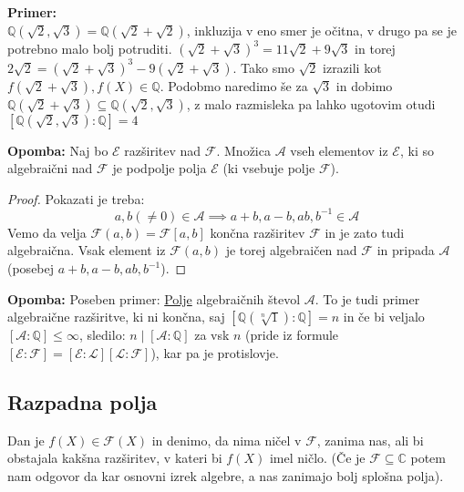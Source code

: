 \documentclass[a4paper]{article}
\newcounter{environment:definition_counter}
\newcounter{environment:theorem_counter}
\newcounter{environment:statement_counter}
\newcounter{example:example_counter}
\newenvironment{example}
{\textbf{Primer:}\\}
{\setcounter{example:example_counter}{0}}
\newenvironment{remark}
{\textbf{Opomba:}}
{}
\begin{document}
\begin{example}
$\mathbb{Q}(\sqrt{2}, \sqrt{3}) =  \mathbb{Q}(\sqrt{2} + \sqrt{2})$, inkluzija v eno smer je očitna, v drugo pa se je potrebno malo bolj potruditi. $(\sqrt{2} + \sqrt{3})^3 = 11\sqrt{2} + 9\sqrt{3}$ in torej $2\sqrt{2} = (\sqrt{2} + \sqrt{3})^3 - 9(\sqrt{2} + \sqrt{3})$. Tako smo $\sqrt{2}$ izrazili kot $f(\sqrt{2} + \sqrt{3}), f(X) \in \mathbb{Q}$. Podobmo naredimo še za $\sqrt{3}$ in dobimo $\mathbb{Q}(\sqrt{2} + \sqrt{3}) \subseteq \mathbb{Q}(\sqrt{2}, \sqrt{3})$, z malo razmisleka pa lahko ugotovim otudi $[\mathbb{Q}(\sqrt{2},\sqrt{3}):\mathbb{Q}] = 4$ 
\end{example}

\begin{remark}
Naj bo $\mathcal{E}$ razširitev nad $\mathcal{F}$. Množica $\mathcal{A}$ vseh elementov iz $\mathcal{E}$, ki so algebraični nad $\mathcal{F}$ je podpolje polja $\mathcal{E}$ (ki vsebuje polje $\mathcal{F}$).
\end{remark}

\begin{proof}
Pokazati je treba:
$$a,b(\neq 0)  \in \mathcal{A} \implies a+b, a-b, ab, b^{-1} \in \mathcal{A}$$
Vemo da velja $\mathcal{F}(a,b) = \mathcal{F}[a,b]$ končna razširitev $\mathcal{F}$ in je zato tudi algebraična. Vsak element iz $\mathcal{F}(a,b)$ je torej algebraičen nad $\mathcal{F}$ in pripada $\mathcal{A}$(posebej $a+b, a-b, ab, b^{-1}$).
\end{proof}

\begin{remark}
Poseben primer: \underline{Polje} algebraičnih števol $\mathcal{A}$. To je tudi primer algebraične razširitve, ki ni končna, saj $[\mathbb{Q}(\sqrt[n]{1}):\mathbb{Q}] = n$ in če bi veljalo $[\mathcal{A}:\mathbb{Q}] \leq \infty$, sledilo: $n \mid [\mathcal{A}:\mathbb{Q}]$ za vsk $n$ (pride iz formule $[\mathcal{E}:\mathcal{F}] = [\mathcal{E}:\mathcal{L}][\mathcal{L}:\mathcal{F}]$), kar pa je protislovje.
\end{remark}

\subsection{Razpadna polja}
Dan je $f(X) \in \mathcal{F}(X)$ in denimo, da nima ničel v $\mathcal{F}$, zanima nas, ali bi obstajala kakšna razširitev, v kateri bi $f(X)$ imel ničlo. (Če je $\mathcal{F} \subseteq \mathbb{C}$ potem nam odgovor da kar osnovni izrek algebre, a nas zanimajo bolj splošna polja).
\end{document}
